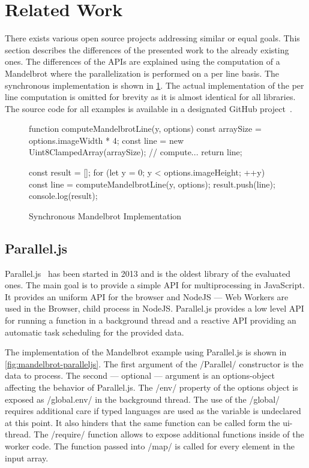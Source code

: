 \section{Related Work}\label{sec:related-work}
There exists various open source projects addressing similar or equal goals. This section describes the differences of the presented work to the already existing ones. The differences of the APIs are explained using the computation of a Mandelbrot where the parallelization is performed on a per line basis. The synchronous implementation is shown in \cref{fig:mandelbrot-sync}. The actual implementation of the per line computation is omitted for brevity as it is almost identical for all libraries. The source code for all examples is available in a designated GitHub project~\cite{Reiser2016}.

\begin{figure}
	
	\begin{javascriptcode}
function computeMandelbrotLine(y, options) {
	const arraySize = options.imageWidth * 4;
	const line = new Uint8ClampedArray(arraySize);
	// compute...
	return line;
}

const result = [];
for (let y = 0; y < options.imageHeight; ++y) {
	const line = computeMandelbrotLine(y, options);
	result.push(line);
}
console.log(result);
\end{javascriptcode}
\caption{Synchronous Mandelbrot Implementation}
\label{fig:mandelbrot-sync}
\end{figure}

\subsection{Parallel.js}
Parallel.js~\cite{SavitzkyMayr2016} has been started in 2013 and is the oldest library of the evaluated ones. The main goal is to provide a simple API for multiprocessing in JavaScript. It provides an uniform API for the browser and NodeJS --- Web Workers are used in the Browser, child process in NodeJS. Parallel.js provides a low level API for running a function in a background thread and a reactive API providing an automatic task scheduling for the provided data. 


The implementation of the Mandelbrot example using Parallel.js is shown in \cref{fig:mandelbrot-paralleljs}. The first argument of the \javascriptinline/Parallel/ constructor is the data to process. The second --- optional ---  argument is an options-object affecting the behavior of Parallel.js. The \javascriptinline/env/ property of the options object is exposed as \javascriptinline/global.env/ in the background thread. The use of the \javascriptinline/global/ requires additional care if typed languages are used as the variable is undeclared at this point. It also hinders that the same function can be called form the ui-thread. The \javascriptinline/require/ function allows to expose additional functions inside of the worker code. The function passed into \javascriptinline/map/ is called for every element in the input array.


